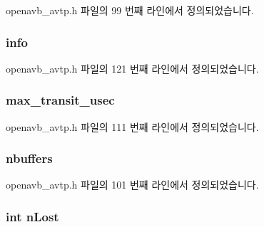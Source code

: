 openavb\+\_\+avtp.\+h 파일의 99 번째 라인에서 정의되었습니다.

\subsubsection[{\texorpdfstring{info}{info}}]{ info}\hypertarget{structavtp__stream__t_a180aa6c9020618ff0caab084c56759f9}{}\label{structavtp__stream__t_a180aa6c9020618ff0caab084c56759f9}


openavb\+\_\+avtp.\+h 파일의 121 번째 라인에서 정의되었습니다.

\subsubsection[{\texorpdfstring{max\+\_\+transit\+\_\+usec}{max_transit_usec}}]{ max\+\_\+transit\+\_\+usec}\hypertarget{structavtp__stream__t_a03a0af93a04672d910ac9108e32f7ab6}{}\label{structavtp__stream__t_a03a0af93a04672d910ac9108e32f7ab6}


openavb\+\_\+avtp.\+h 파일의 111 번째 라인에서 정의되었습니다.

\subsubsection[{\texorpdfstring{nbuffers}{nbuffers}}]{ nbuffers}\hypertarget{structavtp__stream__t_a94614663db649ac71090a1f634aefd98}{}\label{structavtp__stream__t_a94614663db649ac71090a1f634aefd98}


openavb\+\_\+avtp.\+h 파일의 101 번째 라인에서 정의되었습니다.

\subsubsection[{\texorpdfstring{n\+Lost}{nLost}}]{\setlength{\rightskip}{0pt plus 5cm}int n\+Lost}\hypertarget{structavtp__stream__t_a8d73c0624a1f30a89e2d98013aa91187}{}\label{structavtp__stream__t_a8d73c0624a1f30a89e2d98013aa91187}


